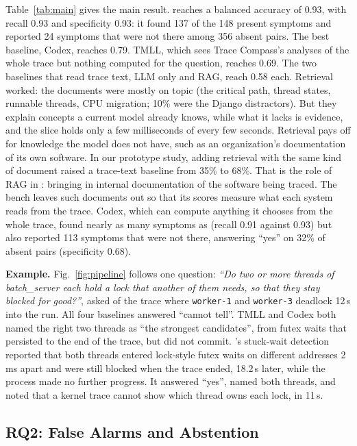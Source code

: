 Table~\ref{tab:main} gives the main result. \sysname reaches a balanced accuracy of 0.93, with recall 0.93 and specificity 0.93: it found 137 of the 148 present symptoms and reported 24 symptoms that were not there among 356 absent pairs. The best baseline, Codex, reaches 0.79. TMLL, which sees Trace Compass's analyses of the whole trace but nothing computed for the question, reaches 0.69. The two baselines that read trace text, LLM only and RAG, reach 0.58 each. Retrieval worked: the documents were mostly on topic (the critical path, thread states, runnable threads, CPU migration; 10\% were the Django distractors). But they explain concepts a current model already knows, while what it lacks is evidence, and the slice holds only a few milliseconds of every few seconds. Retrieval pays off for knowledge the model does not have, such as an organization's documentation of its own software. In our prototype study, adding retrieval with the same kind of document raised a trace-text baseline from 35\% to 68\%. That is the role of RAG in \sysname: bringing in internal documentation of the software being traced. The bench leaves such documents out so that its scores measure what each system reads from the trace. Codex, which can compute anything it chooses from the whole trace, found nearly as many symptoms as \sysname (recall 0.91 against 0.93) but also reported 113 symptoms that were not there, answering ``yes'' on 32\% of absent pairs (specificity 0.68).

\textbf{Example.} Fig.~\ref{fig:pipeline} follows one question: \emph{``Do two or more threads of batch\_server each hold a lock that another of them needs, so that they stay blocked for good?''}, asked of the trace where \texttt{worker-1} and \texttt{worker-3} deadlock 12\,s into the run. All four baselines answered ``cannot tell''. TMLL and Codex both named the right two threads as ``the strongest candidates'', from futex waits that persisted to the end of the trace, but did not commit. \sysname's stuck-wait detection reported that both threads entered lock-style futex waits on different addresses 2\,ms apart and were still blocked when the trace ended, 18.2\,s later, while the process made no further progress. It answered ``yes'', named both threads, and noted that a kernel trace cannot show which thread owns each lock, in 11\,s.

\subsection{RQ2: False Alarms and Abstention}

